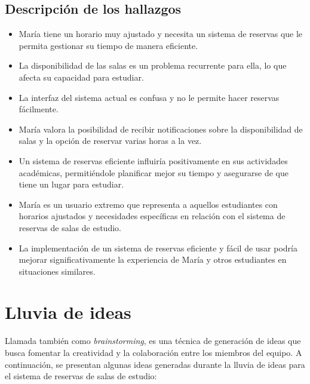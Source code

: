 \documentclass{article}
\begin{document}
  \subsection{Descripción de los hallazgos}

  \begin{itemize}
    \item María tiene un horario muy ajustado y necesita un sistema de reservas que le permita gestionar su tiempo de manera eficiente.
    \item La disponibilidad de las salas es un problema recurrente para ella, lo que afecta su capacidad para estudiar.
    \item La interfaz del sistema actual es confusa y no le permite hacer reservas fácilmente.
    \item María valora la posibilidad de recibir notificaciones sobre la disponibilidad de salas y la opción de reservar varias horas a la vez.
    \item Un sistema de reservas eficiente influiría positivamente en sus actividades académicas, permitiéndole planificar mejor su tiempo y asegurarse de que tiene un lugar para estudiar.
    \item María es un usuario extremo que representa a aquellos estudiantes con horarios ajustados y necesidades específicas en relación con el sistema de reservas de salas de estudio.
    \item La implementación de un sistema de reservas eficiente y fácil de usar podría mejorar significativamente la experiencia de María y otros estudiantes en situaciones similares.
  \end{itemize}

  \section{Lluvia de ideas}
  
  Llamada también como \textit{brainstorming}, es una técnica de generación de ideas que busca fomentar la creatividad y la colaboración entre los miembros del equipo. A continuación, se presentan algunas ideas generadas durante la lluvia de ideas para el sistema de reservas de salas de estudio:
\end{document}
